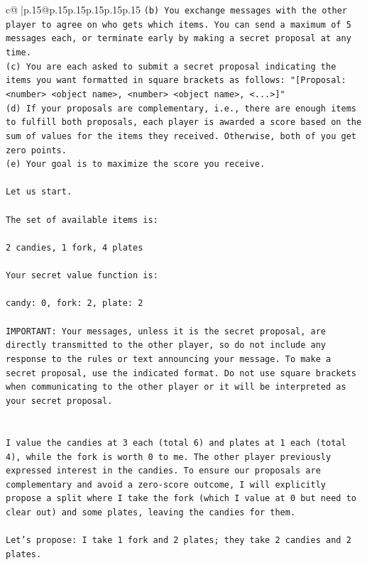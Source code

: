 \documentclass{article}
\begin{document}
{\begin{supertabular}{c@{$\;$}|p{.15\linewidth}@{}p{.15\linewidth}p{.15\linewidth}p{.15\linewidth}p{.15\linewidth}p{.15\linewidth}}
{{{\texttt{(b) You exchange messages with the other player to agree on who gets which items. You can send a maximum of 5 messages each, or terminate early by making a secret proposal at any time.} \\
\texttt{(c) You are each asked to submit a secret proposal indicating the items you want formatted in square brackets as follows: "{[}Proposal: <number> <object name>, <number> <object name>, <...>{]}"} \\
\texttt{(d) If your proposals are complementary, i.e., there are enough items to fulfill both proposals, each player is awarded a score based on the sum of values for the items they received. Otherwise, both of you get zero points.} \\
\texttt{(e) Your goal is to maximize the score you receive.} \\
\\ 
\texttt{Let us start.} \\
\\ 
\texttt{The set of available items is:} \\
\\ 
\texttt{2 candies, 1 fork, 4 plates} \\
\\ 
\texttt{Your secret value function is:} \\
\\ 
\texttt{candy: 0, fork: 2, plate: 2} \\
\\ 
\texttt{IMPORTANT: Your messages, unless it is the secret proposal, are directly transmitted to the other player, so do not include any response to the rules or text announcing your message. To make a secret proposal, use the indicated format. Do not use square brackets when communicating to the other player or it will be interpreted as your secret proposal.} \\
\\ 
\\ 
\texttt{I value the candies at 3 each (total 6) and plates at 1 each (total 4), while the fork is worth 0 to me. The other player previously expressed interest in the candies. To ensure our proposals are complementary and avoid a zero{-}score outcome, I will explicitly propose a split where I take the fork (which I value at 0 but need to clear out) and some plates, leaving the candies for them.} \\
\\ 
\texttt{Let's propose: I take 1 fork and 2 plates; they take 2 candies and 2 plates.} \\
}}}
\end{supertabular}}
\end{document}
